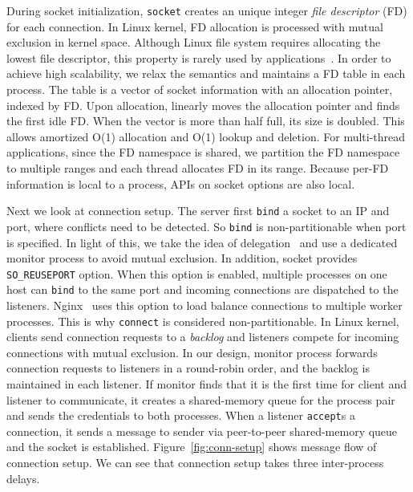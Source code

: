 During socket initialization, \texttt{socket} creates an unique integer \textit{file descriptor} (FD) for each connection. In Linux kernel, FD allocation is processed with mutual exclusion in kernel space. Although Linux file system requires allocating the lowest file descriptor, this property is rarely used by applications~\cite{han2012megapipe,huang2017high}. In order to achieve high scalability, we relax the semantics and maintains a FD table in each process. The table is a vector of socket information with an allocation pointer, indexed by FD. Upon allocation, \libipc{} linearly moves the allocation pointer and finds the first idle FD. When the vector is more than half full, its size is doubled. This allows amortized O(1) allocation and O(1) lookup and deletion. 
For multi-thread applications, since the FD namespace is shared, we partition the FD namespace to multiple ranges and each thread allocates FD in its range.
Because per-FD information is local to a process, APIs on socket options are also local.

Next we look at connection setup. The server first \texttt{bind} a socket to an IP and port, where conflicts need to be detected. So \texttt{bind} is non-partitionable when port is specified. In light of this, we take the idea of delegation~\cite{roghanchi2017ffwd} and use a dedicated monitor process to avoid mutual exclusion.
In addition, socket provides \texttt{SO\_REUSEPORT} option. When this option is enabled, multiple processes on one host can \texttt{bind} to the same port and incoming connections are dispatched to the listeners. Nginx~\cite{nginx} uses this option to load balance connections to multiple worker processes. This is why \texttt{connect} is considered non-partitionable. In Linux kernel, clients send connection requests to a \textit{backlog} and listeners compete for incoming connections with mutual exclusion. In our design, monitor process forwards connection requests to listeners in a round-robin order, and the backlog is maintained in each listener. If monitor finds that it is the first time for client and listener to communicate, it creates a shared-memory queue for the process pair and sends the credentials to both processes. When a listener \texttt{accept}s a connection, it sends a message to sender via peer-to-peer shared-memory queue and the socket is established. Figure~\ref{fig:conn-setup} shows message flow of connection setup. We can see that connection setup takes three inter-process delays.

